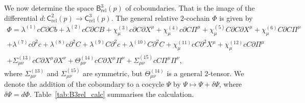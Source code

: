 \documentclass[11pt,reqno,a4paper,final]{amsart}
\theoremstyle{plain}
\theoremstyle{definition}
\renewcommand{\d}{\partial}
\newcommand{\Crel}{\mathsf{C}_{\mathrm{rel}}} %
\newcommand{\Brel}{\mathsf{B}_{\mathrm{rel}}}
\newcommand{\1}{\mathbb{1}}
\numberwithin{equation}{section}
\begin{document}
\begin{appendices}
We now determine the space $\Brel^3(p)$ of coboundaries.  That is the
image of the differential $d \colon \Crel^2(p) \to \Crel^3(p)$.  The
general relative $2$-cochain $\Phi$ is given by
\begin{multline}
  \Phi = \lambda^{(1)} c C \d C  b + \lambda^{(2)} c C \d C B + \chi^{(3)}_\mu c \d C \d X^\mu + \chi^{(4)}_\mu c \d C \Pi^\mu + \chi^{(5)}_\mu C \d C \d X^\mu + \chi^{(6)}_\mu C \d C \Pi^\mu\\
  + \lambda^{(7)} c \d^2 c + \lambda^{(8)} c \d^2 C + \lambda^{(9)} C
  \d^2  c + \lambda^{(10)} C \d^2 C + \chi^{(11)}_\mu c C \d^2 X^\mu + \chi^{(12)}_\mu c C \d \Pi^\mu\\
  + \Sigma^{(13)}_{\mu\nu} c C \d X^\mu \d X^\nu + \Theta^{(14)}_{\mu\nu} c C \d X^\mu \Pi^\nu + \Sigma^{(15)}_{\mu\nu} c C \Pi^\mu \Pi^\nu,
\end{multline}
where $\Sigma^{(13)}_{\mu\nu}$ and $\Sigma^{(15)}_{\mu\nu}$ are symmetric, but $\Theta^{(14)}_{\mu\nu}$ is a general $2$-tensor.
We denote the addition of the coboundary to a cocycle $\Psi$ by $\Psi
\mapsto \Psi + \delta\Psi$, where $\delta\Psi = d\Phi$.
Table~\ref{tab:B3rel_calc} summarises the calculation.


\end{appendices}
\end{document}
